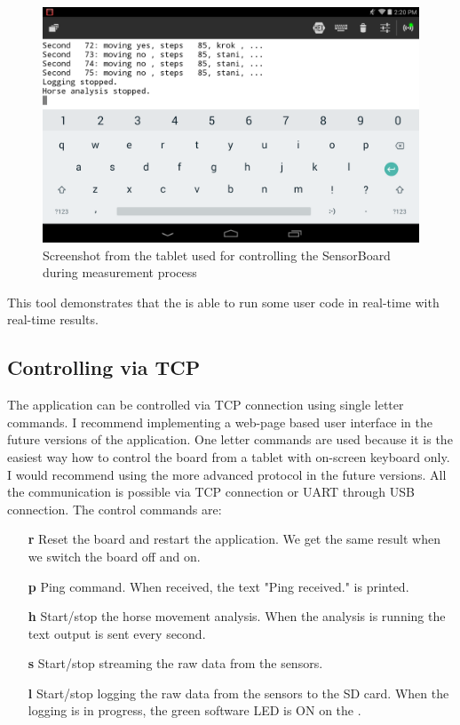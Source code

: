 \begin{figure}
    \centering
    \caption{Screenshot from the tablet used for controlling the SensorBoard during measurement process}
    \label{fig:HorseAnalysisTablet}
    \includegraphics[width=\linewidth]{img/HorseAnalysisTablet.png}
\end{figure}

This tool demonstrates that the  is able to run some user code in real-time with real-time results.

\subsection{Controlling via \ac{TCP}}
The application can be controlled via \ac{TCP} connection using single letter commands. I recommend implementing a web-page based user interface in the future versions of the application. One letter commands are used because it is the easiest way how to control the board from a tablet with on-screen keyboard only. I would recommend using the more advanced protocol in the future versions. All the communication is possible via \ac{TCP} connection or UART through USB connection. The control commands are:

\begin{itemize}
    \item[\textbf{r}] Reset the board and restart the application. We get the same result when we switch the board off and on.
    \item[\textbf{p}] Ping command. When received, the text "Ping received." is printed.
    \item[\textbf{h}] Start/stop the horse movement analysis. When the analysis is running the text output is sent every second.
    \item[\textbf{s}] Start/stop streaming the raw data from the sensors.
    \item[\textbf{l}] Start/stop logging the raw data from the sensors to the SD card. When the logging is in progress, the green software LED is ON on the .
\end{itemize}

